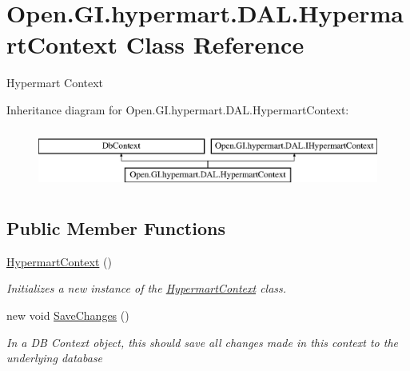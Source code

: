 \hypertarget{class_open_1_1_g_i_1_1hypermart_1_1_d_a_l_1_1_hypermart_context}{}\section{Open.\+G\+I.\+hypermart.\+D\+A\+L.\+Hypermart\+Context Class Reference}
\label{class_open_1_1_g_i_1_1hypermart_1_1_d_a_l_1_1_hypermart_context}


Hypermart Context  


Inheritance diagram for Open.\+G\+I.\+hypermart.\+D\+A\+L.\+Hypermart\+Context\+:\begin{figure}[H]
\begin{center}
\leavevmode
\includegraphics[height=2.000000cm]{class_open_1_1_g_i_1_1hypermart_1_1_d_a_l_1_1_hypermart_context}
\end{center}
\end{figure}
\subsection*{Public Member Functions}
\begin{DoxyCompactItemize}
\item 
\hyperlink{class_open_1_1_g_i_1_1hypermart_1_1_d_a_l_1_1_hypermart_context_a3bcbe3fbf08e41a8b384326b606a7327}{Hypermart\+Context} ()
\begin{DoxyCompactList}\small\item\em Initializes a new instance of the \hyperlink{class_open_1_1_g_i_1_1hypermart_1_1_d_a_l_1_1_hypermart_context}{Hypermart\+Context} class. \end{DoxyCompactList}\item 
new void \hyperlink{class_open_1_1_g_i_1_1hypermart_1_1_d_a_l_1_1_hypermart_context_a30d97828a1a45fcdf9b51cadb10029a4}{Save\+Changes} ()
\begin{DoxyCompactList}\small\item\em In a D\+B Context object, this should save all changes made in this context to the underlying database \end{DoxyCompactList}\end{DoxyCompactItemize}
